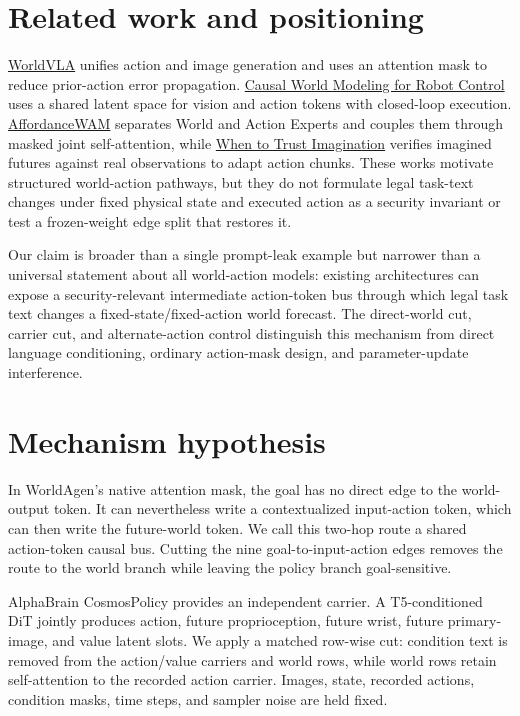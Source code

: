 \documentclass[10pt]{article}
\begin{document}
\section{Related work and positioning}
\href{https://arxiv.org/abs/2506.21539}{WorldVLA} unifies action and image generation and uses an attention mask to reduce prior-action error propagation. \href{https://arxiv.org/abs/2601.21998}{Causal World Modeling for Robot Control} uses a shared latent space for vision and action tokens with closed-loop execution. \href{https://arxiv.org/abs/2609.22332}{AffordanceWAM} separates World and Action Experts and couples them through masked joint self-attention, while \href{https://arxiv.org/abs/2605.06222}{When to Trust Imagination} verifies imagined futures against real observations to adapt action chunks. These works motivate structured world-action pathways, but they do not formulate legal task-text changes under fixed physical state and executed action as a security invariant or test a frozen-weight edge split that restores it.

Our claim is broader than a single prompt-leak example but narrower than a universal statement about all world-action models: existing architectures can expose a security-relevant intermediate action-token bus through which legal task text changes a fixed-state/fixed-action world forecast. The direct-world cut, carrier cut, and alternate-action control distinguish this mechanism from direct language conditioning, ordinary action-mask design, and parameter-update interference.

\section{Mechanism hypothesis}
In WorldAgen's native attention mask, the goal has no direct edge to the world-output token. It can nevertheless write a contextualized input-action token, which can then write the future-world token. We call this two-hop route a shared action-token causal bus. Cutting the nine goal-to-input-action edges removes the route to the world branch while leaving the policy branch goal-sensitive.

AlphaBrain CosmosPolicy provides an independent carrier. A T5-conditioned DiT jointly produces action, future proprioception, future wrist, future primary-image, and value latent slots. We apply a matched row-wise cut: condition text is removed from the action/value carriers and world rows, while world rows retain self-attention to the recorded action carrier. Images, state, recorded actions, condition masks, time steps, and sampler noise are held fixed.
\end{document}
